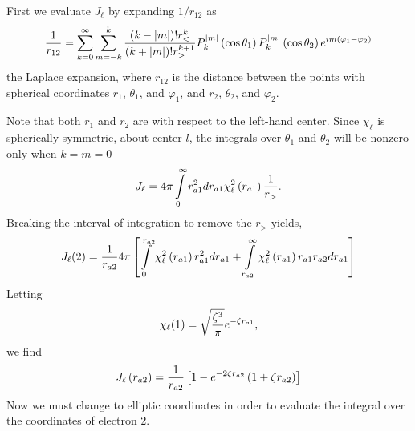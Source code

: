First we evaluate $J_\ell$ by expanding $1/r_{12}$ as
\begin{equation}
{1 \over r_{12}} = \sum^{\infty}_{k=0} \sum^{k}_{m=-k} {\left( k - 
\vert m \vert \right) ! r^k_< \over \left( k + \vert m \vert \right) ! 
r^{k+1}_>} P^{|m|}_k \left( \cos \theta_1 \right) P^{|m|}_k \left( 
\cos \theta_2 \right) e^{im(\varphi_1 - \varphi_2)}
\end{equation}
the Laplace expansion, where $r_{12}$ is the distance between the points 
with spherical coordinates $r_1$, $\theta_1$, and $\varphi_1$, and 
$r_2$, $\theta_2$, and $\varphi_2$.

Note that both $r_1$ and $r_2$ are with respect to the left-hand 
center. Since $\chi_\ell$ is spherically symmetric, about center $l$, the 
integrals over $\theta_1$  and $\theta_2$ will be nonzero only when $k = 
m = 0$
\begin{equation}
J_\ell = 4 \pi \int\limits^{\infty}_{0} r^2_{a1} d r_{a1} \chi^2_\ell 
\left( r_{a1} \right) {1 \over r_>} .
\end{equation}
Breaking the interval of integration to remove the $r_>$ yields,
\begin{equation}
J_\ell(2) = {1 \over r_{a2}} 4 \pi \left[ \int\limits^{r_{a2}}_{0} 
\chi^2_\ell \left( r_{a1} \right) r^2_{a1} d r_{a1} + 
\int\limits^{\infty}_{r_{a2}} \chi^2_\ell \left( r_{a1} \right) r_{a1} 
r_{a2} d r_{a1} \right]
\end{equation}
Letting
\begin{equation}
\chi_\ell(1) = \sqrt{{\zeta^3 \over \pi}} e^{- \zeta r_{a1}} ,
\end{equation}
we find
\begin{equation}
J_\ell \left( r_{a2} \right) = {1 \over r_{a2}} \left[ 1 - e^{-2 \zeta 
r_{a2}} \left( 1 + \zeta r_{a2} \right) \right]
\label{eqno2app-18}
\end{equation}
Now we must change to elliptic coordinates in order to evaluate the 
integral over the coordinates of electron 2.
    
